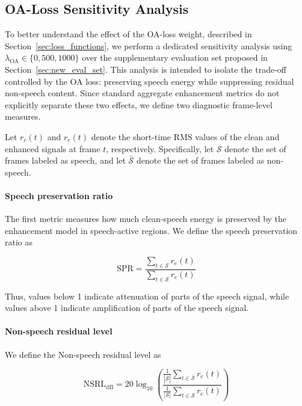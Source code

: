 \documentclass[final,5p,times,authoryear]{elsarticle}
\begin{document}
\subsection{OA-Loss Sensitivity Analysis}
\label{sec:oa_sensitivity}

To better understand the effect of the OA-loss weight, described in Section~\ref{sec:loss_functions}, we perform a dedicated sensitivity analysis using $\lambda_{\mathrm{OA}}\in\{0,500,1000\}$ over the supplementary evaluation set proposed in Section~\ref{sec:new_eval_set}. This analysis is intended to isolate the trade-off controlled by the OA loss:
preserving speech energy while suppressing residual non-speech content. Since standard aggregate enhancement metrics do not explicitly separate these two effects, we define two diagnostic frame-level measures.

Let $r_c(t)$ and $r_e(t)$ denote the short-time RMS values of the clean and enhanced signals at frame $t$, respectively. Specifically, let $\mathcal{S}$ denote the set of frames labeled as speech, and let $\bar{\mathcal{S}}$ denote the set of frames labeled as non-speech.

\paragraph{\textbf{Speech preservation ratio}}
The first metric measures how much clean-speech energy is preserved by the enhancement model in speech-active regions. We define the speech preservation ratio as

\begin{equation}    
\mathrm{SPR}
=
\frac{
\sum_{t \in \mathcal{S}} r_e(t)
}{
\sum_{t \in \mathcal{S}} r_c(t)
}
\end{equation}


Thus, values below 1 indicate attenuation of parts of the speech signal, while values above 1 indicate amplification of parts of the speech signal.

\paragraph{\textbf{Non-speech residual level}}
We define the Non-speech residual level as

\begin{equation} 
\mathrm{NSRL}_{\mathrm{dB}}
=
20 \log_{10}
\left(
\frac{
\frac{1}{|\bar{\mathcal{S}}|}
\sum_{t \in \bar{\mathcal{S}}} r_e(t)
}{
\frac{1}{|\mathcal{S}|}
\sum_{t \in \mathcal{S}} r_c(t)
}
\right)
\end{equation}
\end{document}
